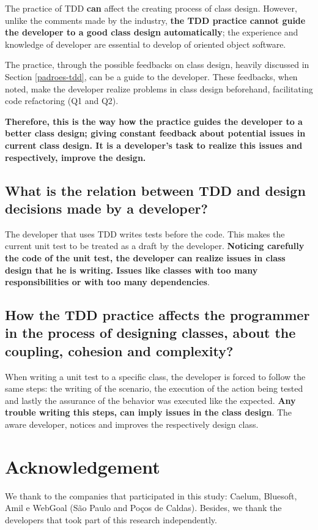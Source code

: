 \documentclass[conference]{IEEEtran}
\begin{document}
The practice of TDD \textbf{can} affect the creating process of class design. However,
unlike the comments made by the industry, \textbf{the TDD practice cannot guide the
developer to a good class design automatically}; the experience and knowledge of
developer are essential to develop of oriented object software.

The practice, through the possible feedbacks on class design, heavily
discussed in Section \ref{padroes-tdd}, can be a guide to the developer.
These feedbacks, when noted, make the developer realize problems in class
design beforehand, facilitating code refactoring (Q1 and Q2).

\textbf{Therefore, this is the way how the practice guides the developer to
a better class design; giving constant feedback about potential issues in
current class design. It is a developer's task to realize this issues and
respectively, improve the design. }

\subsection{What is the relation between TDD and design decisions made by
a developer?}

The developer that uses TDD writes tests before the code. This makes
the current unit test to be treated as a draft by the developer.
\textbf{Noticing carefully the code of the unit test, the developer can
realize issues in class design that he is writing. Issues like 
classes with too many responsibilities or with too many dependencies}.

\subsection{How the TDD practice affects the programmer in the process of designing
classes, about the coupling, cohesion and complexity?}

When writing a unit test to a specific class, the developer is forced to follow
the same steps: the writing of the scenario, the execution of the action being
tested and lastly the assurance of the behavior was executed like the
expected.
\textbf{Any trouble writing this steps, can imply issues in the class design}. 
The aware developer, notices and improves the respectively design class.

\section*{Acknowledgement}

We thank to the companies that participated in this study: Caelum, Bluesoft,
Amil e WebGoal (São Paulo and Poços de Caldas). Besides, we thank the
developers that took part of this research independently.


\footnotesize{}

\end{document}
